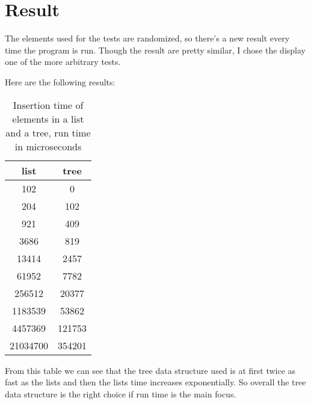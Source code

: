\documentclass[a4paper,11pt]{article}
\begin{document}
\section{Result}

The elements used for the tests are randomized, so there's a new result every time the program is run. Though the result are pretty similar, I chose the display one of the more arbitrary tests.

Here are the following results:

\begin{table}
\begin{center}
\begin{tabular}{|c|c|}
\textbf{list} & \textbf{tree}\\
\hline
       102 &     0\\
      204 &     102\\
        921 &     409\\
       3686 &     819\\
      13414 &     2457\\
        61952 &     7782\\
      256512 &     20377\\
      1183539 &     53862\\
      4457369 &     121753\\
        21034700 &     354201\\
\end{tabular}
\caption{Insertion time of elements in a list and a tree, run time in microseconds}
\label{tab:table1}
\end{center}
\end{table}

From this table we can see that the tree data structure used is at first twice as fast as the lists and then the lists time increases exponentially. So overall the tree data structure is the right choice if run time is the main focus.
\end{document}
